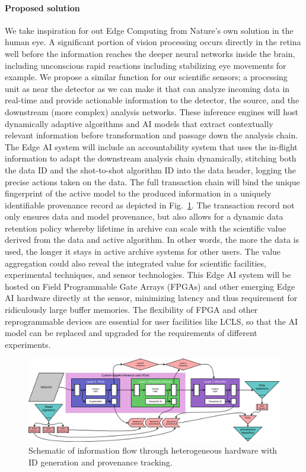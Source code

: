 \documentclass{article}
\begin{document}
\paragraph{Proposed solution}
We take inspiration for out Edge Computing from Nature's own solution in the human eye.
A significant portion of vision processing occurs directly in the retina well before the information reaches the deeper neural networks inside the brain, including unconscious rapid reactions including stabilizing eye movements for example.
We propose a similar function for our scientific sensors; a processing unit as near the detector as we can make it that can analyze incoming data in real-time and provide actionable information to the detector, the source, and the downstream (more complex) analysis networks.
These inference engines will host dynamically adaptive algorithms and AI models that extract contextually relevant information before transformation and passage down the analysis chain.
The Edge AI system will include an accountability system that uses the in-flight information to adapt the downstream analysis chain dynamically, stitching both the data ID and the shot-to-shot algorithm ID into the data header, logging the precise actions taken on the data.
The full transaction chain will bind the unique fingerprint of the active model to the produced information in a uniquely identifiable provenance record as depicted in Fig.~\ref{fig::EdgeFlow}.
The transaction record not only ensures data and model provenance, but also allows for a dynamic data retention policy whereby lifetime in archive can scale with the scientific value derived from the data and active algorithm.
In other words, the more the data is used, the longer it stays in active archive systems for other users. %
The value aggregation could also reveal the integrated value for scientific facilities, experimental techniques, and sensor technologies.
This Edge AI system will be hosted on Field Programmable Gate Arrays (FPGAs) and other emerging Edge AI hardware \cite{edgetpu_benchmarks,edgetpu,waveCGRA,CGRAreview,seaofcores} directly at the sensor, minimizing latency and thus requirement for ridiculously large buffer memories.
The flexibility of FPGA and other reprogrammable devices are essential for user facilities like LCLS, so that the AI model can be replaced and upgraded for the requirements of different experiments. 


\begin{figure}
	\centerline{\includegraphics[clip,width=.75\linewidth]{EdgeFlow.eps}}
	\caption{
		\label{fig::EdgeFlow}
		Schematic of information flow through heterogeneous hardware with ID generation and provenance tracking.
		}
\end{figure}
\end{document}
